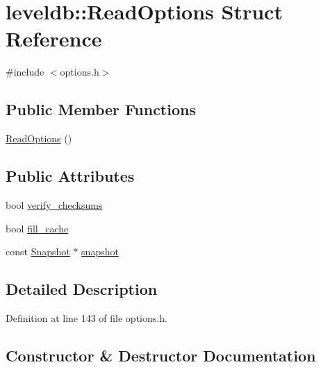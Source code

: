\hypertarget{structleveldb_1_1_read_options}{}\section{leveldb\+:\+:Read\+Options Struct Reference}
\label{structleveldb_1_1_read_options}


{\ttfamily \#include $<$options.\+h$>$}

\subsection*{Public Member Functions}
\begin{DoxyCompactItemize}
\item 
\hyperlink{structleveldb_1_1_read_options_a6bf119f5a33b0d0a70fb60d8114351ef}{Read\+Options} ()
\end{DoxyCompactItemize}
\subsection*{Public Attributes}
\begin{DoxyCompactItemize}
\item 
bool \hyperlink{structleveldb_1_1_read_options_a43731d67b707995e20571ad33c1f53f2}{verify\+\_\+checksums}
\item 
bool \hyperlink{structleveldb_1_1_read_options_a49f3754f8838596148ed5cbf9bbf8664}{fill\+\_\+cache}
\item 
const \hyperlink{classleveldb_1_1_snapshot}{Snapshot} $\ast$ \hyperlink{structleveldb_1_1_read_options_a1fa3fffc267dff89fce7c39d7c7b5b50}{snapshot}
\end{DoxyCompactItemize}


\subsection{Detailed Description}


Definition at line 143 of file options.\+h.



\subsection{Constructor \& Destructor Documentation}
\hypertarget{structleveldb_1_1_read_options_a6bf119f5a33b0d0a70fb60d8114351ef}{}
